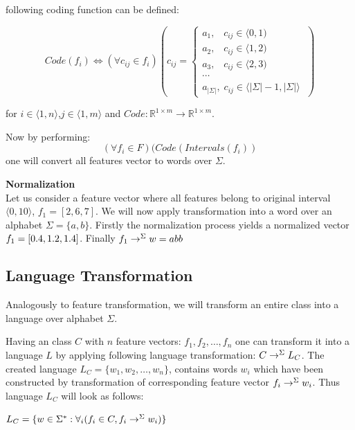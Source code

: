 \documentclass{mini}
\begin{document}
following coding function can be defined:

\begin{equation}
Code(f_i) \Leftrightarrow (\forall{c_{ij} \in f_i})(c_{ij} = 
\begin{cases}
a_1 , \;\;\; c_{ij} \in  \langle 0 , 1)  \\
a_2 , \;\;\; c_{ij} \in  \langle 1 , 2 ) \\
a_3 , \;\;\; c_{ij} \in  \langle 2 , 3 )\\
\cdots \\
a_{|\Sigma|} , \; c_{ij} \in \langle |\Sigma| -1, |\Sigma|  \rangle\; 
\end{cases})
\end{equation}

for $i \in \langle 1, n \rangle$,$j \in \langle 1, m \rangle$ and $Code : \mathbb{R}^{1 \times m} \rightarrow \mathbb{R}^{1 \times m}$.

Now by performing:
\begin{equation}
(\forall{f_i \in F})(Code(Intervals(f_i))
\end{equation}
one will convert all features vector to words over $\Sigma$.

\begin{example} {\bf Normalization}\\
    Let us consider a feature vector where all features belong to original interval $\langle 0, 10 \rangle$, $f_1=[2, 6, 7]$. We will now apply transformation into a word over an alphabet $\Sigma=\{a,b\}$. Firstly the normalization process yields a normalized vector $f_1=[0.4, 1.2, 1.4]$. Finally $f_1 \rightarrow^{\Sigma}w=abb$
\end{example}


\subsection{Language Transformation}\label{sec:lan_theory_transf_lan}
Analogously to feature transformation, we will transform an entire class into a language over alphabet $\Sigma$.

Having an class $C$ with $n$ feature vectors: $f_1, f_2,\ldots,f_n$ one can transform it into a language $L$ by applying following language transformation: $C \rightarrow^{\Sigma} L_{C}$. The created language $L_{C} = \{w_1, w_2,\ldots,w_n\}$, contains words $w_i$ which have been constructed by transformation of corresponding feature vector $f_i \rightarrow^{\Sigma} w_i$. Thus language $L_{C}$ will look as follows:
\begin{center}
    $L_{C} = \{w \in \Sigma^{*} : \forall_{i} (f_{i} \in C, f_{i} \rightarrow^{\Sigma} w_{i}) \}$
\end{center}
\end{document}
